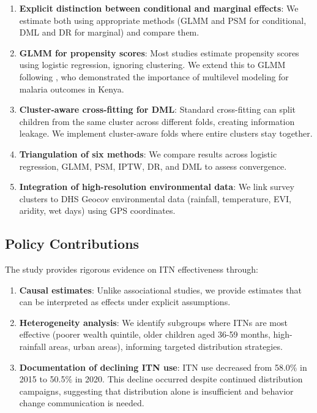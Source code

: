 \begin{enumerate}
	\item \textbf{Explicit distinction between conditional and marginal effects}: We estimate both using appropriate methods (GLMM and PSM for conditional, DML and DR for marginal) and compare them.
	
	\item \textbf{GLMM for propensity scores}: Most studies estimate propensity scores using logistic regression, ignoring clustering. We extend this to GLMM following \citet{ayele2024assessment}, who demonstrated the importance of multilevel modeling for malaria outcomes in Kenya.
	
	\item \textbf{Cluster-aware cross-fitting for DML}: Standard cross-fitting can split children from the same cluster across different folds, creating information leakage. We implement cluster-aware folds where entire clusters stay together.
	
	\item \textbf{Triangulation of six methods}: We compare results across logistic regression, GLMM, PSM, IPTW, DR, and DML to assess convergence.
	
	\item \textbf{Integration of high-resolution environmental data}: We link survey clusters to DHS Geocov environmental data (rainfall, temperature, EVI, aridity, wet days) using GPS coordinates.
\end{enumerate}

\subsection{Policy Contributions}

The study provides rigorous evidence on ITN effectiveness through:

\begin{enumerate}
	\item \textbf{Causal estimates}: Unlike associational studies, we provide estimates that can be interpreted as effects under explicit assumptions.
	
	\item \textbf{Heterogeneity analysis}: We identify subgroups where ITNs are most effective (poorer wealth quintile, older children aged 36-59 months, high-rainfall areas, urban areas), informing targeted distribution strategies.
	
	\item \textbf{Documentation of declining ITN use}: ITN use decreased from 58.0\% in 2015 to 50.5\% in 2020. This decline occurred despite continued distribution campaigns, suggesting that distribution alone is insufficient and behavior change communication is needed.
\end{enumerate}

